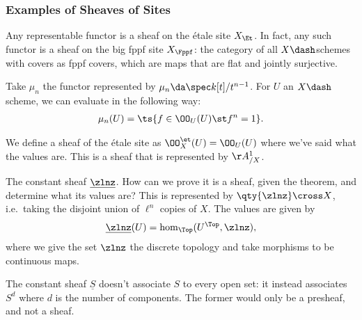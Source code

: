 \hypertarget{examples-of-sheaves-of-sites}{%
\subsubsection{Examples of Sheaves of
Sites}\label{examples-of-sheaves-of-sites}}

\begin{theorem}[?]

Any representable functor is a sheaf on the étale site \(X_{\Et}\). In
fact, any such functor is a sheaf on the big fppf site \(X_{\Fppf}\):
the category of all \(X\dash\)schemes with covers as fppf covers, which
are maps that are flat and jointly surjective.

\end{theorem}

\begin{example}

Take \(\mu_n\) the functor represented by
\(\mu_n \da \spec k[t] / t^{n-1}\). For \(U\) an \(X\dash\)scheme, we
can evaluate in the following way:
\begin{align*}  
\mu_n(U) = \ts{f\in \OO_U(U) \st f^n = 1}
.\end{align*}

\end{example}

\begin{example}[?]

We define a sheaf of the étale site as \(\OO^{\et}_X(U) = \OO_U(U)\)
where we've said what the values are. This is a sheaf that is
represented by \(\AA^1_{/X}\).

\end{example}

\begin{example}[?]

The constant sheaf \(\underline{\zlnz}\). How can we prove it is a
sheaf, given the theorem, and determine what its values are? This is
represented by \(\qty{\zlnz} \cross X\), i.e.~taking the disjoint union
of \(\ell^n\) copies of \(X\). The values are given by
\begin{align*}  
\underline{\zlnz}(U) =  \hom_{\Top}(U^{\Top}, \zlnz)
,\end{align*} where we give the set \(\zlnz\) the discrete topology and
take morphisms to be continuous maps.

\end{example}

\begin{warnings}

The constant sheaf \(\underline{S}\) doesn't associate \(S\) to every
open set: it instead associates \(S^d\) where \(d\) is the number of
components. The former would only be a presheaf, and not a sheaf.

\end{warnings}

